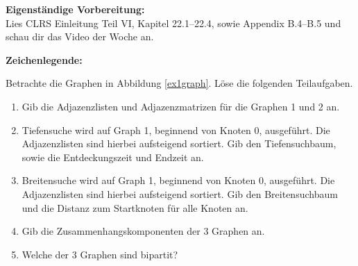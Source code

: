 \documentclass{uebung_cs}
\begin{document}
\textbf{Eigenständige Vorbereitung:}\\
Lies  CLRS Einleitung Teil VI, Kapitel 22.1--22.4, sowie Appendix B.4--B.5 und schau dir das  Video der Woche an.

\textbf{Zeichenlegende:}
\legende{}


\begin{aufgabe}\label{tue-first}
	Betrachte die Graphen in Abbildung \ref{ex1graph}.
	Löse die folgenden Teilaufgaben.
	\begin{enumerate}
		\item %
    Gib die Adjazenzlisten und Adjazenzmatrizen für die Graphen 1 und 2 an.
		\item %
    Tiefensuche wird auf Graph 1, beginnend von Knoten 0, ausgeführt.
		Die Adjazenzlisten sind hierbei aufsteigend sortiert.
		Gib den Tiefensuchbaum, sowie die Entdeckungszeit und Endzeit an.
		\item %
    Breitensuche wird auf Graph 1, beginnend von Knoten 0, ausgeführt.
		Die Adjazenzlisten sind hierbei aufsteigend sortiert.
		Gib den Breitensuchbaum und die Distanz zum Startknoten für alle Knoten an.
		\item Gib die Zusammenhangskomponenten der 3 Graphen an.
		\item Welche der 3 Graphen sind bipartit?
	\end{enumerate}
\end{aufgabe}
\end{document}
